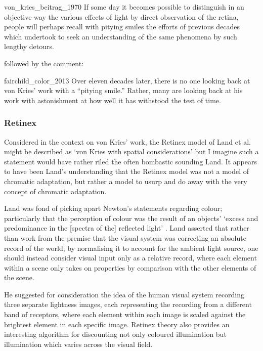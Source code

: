 \begin{citequote}{von_kries_beitrag_1970}
If some day it becomes possible to distinguish in an objective way the
various effects of light by direct observation of the retina, people will perhaps
recall with pitying smiles the efforts of previous decades which
undertook to seek an understanding of the same phenomena by such
lengthy detours.
\end{citequote}

followed by the comment:

\begin{citequote}{fairchild_color_2013}
Over eleven decades later, there is no one looking back at von Kries’ work
with a “pitying smile.” Rather, many are looking back at his work with
astonishment at how well it has withstood the test of time.
\end{citequote}

\subsubsection{Retinex}

Considered in the context on von Kries' work, the Retinex model of Land et al. \citep{land_retinex_1964,land_lightness_1971,land_recent_1983,land_recent_1986,mccann_quantitative_1976} might be described as `von Kries with spatial considerations' but I imagine such a statement would have rather riled the often bombastic sounding Land. It appears to have been Land's understanding that the Retinex model was not a model of chromatic adaptation, but rather a model to usurp and do away with the very concept of chromatic adaptation.

Land was fond of picking apart Newton's statements regarding colour; particularly that the perception of colour was the result of an objects' `excess and predominance in the [spectra of the] reflected light' \citep{newton_opticks_1704}. Land asserted that rather than work from the premise that the visual system was correcting an absolute record of the world, by normalising it to account for the ambient light source, one should instead consider visual input only as a relative record, where each element within a scene only takes on properties by comparison with the other elements of the scene. 

He suggested for consideration the idea of the human visual system recording three separate lightness images, each representing the recording from a different band of receptors, where each element within each image is scaled against the brightest element in each specific image. Retinex theory also provides an interesting algorithm for discounting not only coloured illumination but illumination which varies across the visual field.

